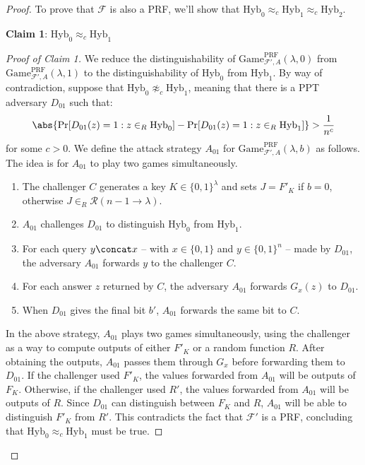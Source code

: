 \documentclass[a4paper, 12pt]{report}
\begin{document}
\begin{proof}
        To prove that $\mathcal{F}$ is also a PRF, we'll show that $\mathrm{Hyb}_0 \approx_c \mathrm{Hyb}_1 \approx_c \mathrm{Hyb}_2$.
        
        \textbf{Claim 1}: $\mathrm{Hyb}_0 \approx_c \mathrm{Hyb}_1$
        
        \begin{proof}[Proof of Claim 1]
            We reduce the distinguishability of $\mathrm{Game}_{\mathcal{F}',A}^{\text{PRF}}(\lambda, 0)$ from $\mathrm{Game}_{\mathcal{F}',A}^{\text{PRF}}(\lambda, 1)$ to the distinguishability of $\mathrm{Hyb}_0$ from $\mathrm{Hyb}_1$. By way of contradiction, suppose that $\mathrm{Hyb}_0 \not\approx_c \mathrm{Hyb}_{1}$, meaning that there is a PPT adversary $D_{01}$ such that:
            \[\abs{\Pr[D_{01}(z) = 1 : z \in_R \mathrm{Hyb}_0] - \Pr[D_{01}(z) = 1 : z \in_R \mathrm{Hyb}_1]} > \frac{1}{n^c}\]
            for some $c > 0$. We define the attack strategy $A_{01}$ for $\mathrm{Game}_{\mathcal{F}',A}^{\text{PRF}}(\lambda, b)$ as follows. The idea is for $A_{01}$ to play two games simultaneously.

            \begin{enumerate}
                \item The challenger $C$ generates a key $K \in \{0,1\}^\lambda$ and sets $J = F'_K$ if $b = 0$, otherwise $J \in_R \mathcal{R}(n-1 \to \lambda)$.
                \item $A_{01}$ challenges $D_{01}$ to distinguish $\mathrm{Hyb}_0$ from $\mathrm{Hyb}_1$.
                \item For each query $y \concat x$ -- with $x \in \{0,1\}$ and $y \in \{0,1\}^n$ -- made by $D_{01}$, the adversary $A_{01}$ forwards $y$ to the challenger $C$.
                \item For each answer $z$ returned by $C$, the adversary $A_{01}$ forwards $G_x(z)$ to $D_{01}$.
                \item When $D_{01}$ gives the final bit $b'$, $A_{01}$ forwards the same bit to $C$.
            \end{enumerate}

            In the above strategy, $A_{01}$ plays two games simultaneously, using the challenger as a way to compute outputs of either $F'_K$ or a random function $R$. After obtaining the outputs, $A_{01}$ passes them through $G_x$ before forwarding them to $D_{01}$. If the challenger used $F'_K$, the values forwarded from $A_{01}$ will be outputs of $F_K$. Otherwise, if the challenger used $R'$, the values forwarded from $A_{01}$ will be outputs of $R$. Since $D_{01}$ can distinguish between $F_K$ and $R$, $A_{01}$ will be able to distinguish $F'_K$ from $R'$. This contradicts the fact that $\mathcal{F}'$ is a PRF, concluding that $\mathrm{Hyb}_0 \approx_c \mathrm{Hyb}_{1}$ must be true.
        \end{proof}


\end{proof}
\end{document}
